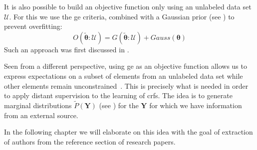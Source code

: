It is also possible to build an \gls{objective function} only using an unlabeled data set $\mathcal{U}$.
For this we use the \gls{ge} criteria, combined with a Gaussian prior (see ) to prevent overfitting:
\begin{equation}
  \label{equ:objective-function-g}
  O(\bm{\tilde{\theta}}:\mathcal{U})=G(\bm{\tilde{\theta}}:\mathcal{U})+Gauss(\bm{\theta})
\end{equation}
Such an approach was first discussed in \citet{mann2008generalized}.

Seen from a different perspective, using \gls{ge} as an objective function allows us to express expectations on a subset of elements from an unlabeled data set while other elements remain unconstrained~\citep{mann2010generalized}.
This is precisely what is needed in order to apply \gls{distant supervision} to the learning of \glspl{crf}.
The idea is to generate \glspl{marginal distribution} $\tilde{P}(\bm{Y})$ (see ) for the $\bm{Y}$ for which we have information from an external source.

In the following chapter we will elaborate on this idea with the goal of extraction of authors from the reference section of research papers.

